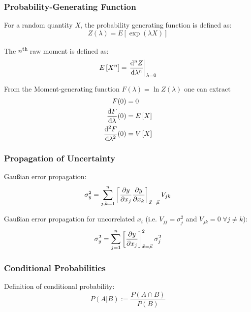 		\subsubsection{Probability-Generating Function}
			\noindent
			For a random quantity $X$, the probability generating function is defined as:
			\begin{equation}
				Z(\lambda) = E\left[ \exp(\lambda X) \right]
			\end{equation}

			\noindent
			The $n$\textsuperscript{th} raw moment is defined as:
			\begin{equation}
				E\left[X^n\right] = \left.\frac{\mathrm{d}^n Z}{\mathrm{d} \lambda^n}\right|_{\lambda=0}
			\end{equation}

			\noindent
			From the Moment-generating function $F(\lambda)=\ln Z(\lambda)$ one can extract
			\begin{equation}
				\begin{aligned}
					F(0) &= 0 \\
					\frac{\mathrm{d} F}{\mathrm{d} \lambda}(0) &= E\left[X\right] \\
					\frac{\mathrm{d}^2 F}{\mathrm{d} \lambda^2}(0) &= V\left[X\right] \\
				\end{aligned}
			\end{equation}


		\subsubsection{Propagation of Uncertainty}
			\noindent
			Gaußian error propagation:
			\begin{equation}
				\sigma_y^2 = \sum_{j,k=1}^n \left[\frac{\partial y}{\partial x_j}\frac{\partial y}{\partial x_k}\right]_{\vec{x}=\vec{\mu}} V_{jk}
			\end{equation}

			\noindent
			Gaußian error propagation for uncorrelated  $x_i$ (i.e. $V_{jj} = \sigma_{j}^2$ and $V_{jk} = 0 \;\forall j\ne k$):
			\begin{equation}
				\sigma_y^2 = \sum_{j=1}^n \left[\frac{\partial y}{\partial x_j}\right]^2_{\vec{x}=\vec{\mu}} \sigma_j^2
			\end{equation}


		\subsubsection{Conditional Probabilities}
			\noindent
			Definition of conditional probability:
			\begin{equation}
				P(A|B) := \frac{P(A \cap B)}{P(B)}
			\end{equation}

